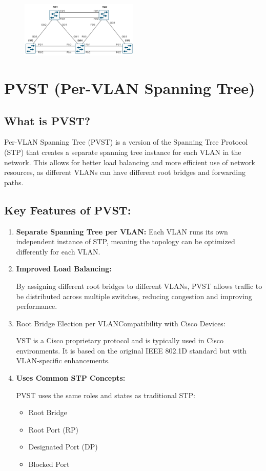 \documentclass[a4paper]{book}
\begin{document}
\begin{figure}[h]
    \centering
    \includegraphics[width=0.5\textwidth]{img/stp05.png}
    \caption{\textit{}}
\end{figure}

\chapter{PVST (Per-VLAN Spanning Tree)}

\section*{What is PVST?}
Per-VLAN Spanning Tree (PVST) is a version of the Spanning Tree Protocol (STP) that creates a separate spanning tree instance for each VLAN in the network. This allows for better load balancing and more efficient use of network resources, as different VLANs can have different root bridges and forwarding paths.


\section*{Key Features of PVST:}
\begin{enumerate}
    \item \textbf{Separate Spanning Tree per VLAN:}
    \newline
    Each VLAN runs its own independent instance of STP, meaning the topology can be optimized differently for each VLAN.
    \item \textbf{Improved Load Balancing:}
    
    By assigning different root bridges to different VLANs, PVST allows traffic to be distributed across multiple switches, reducing congestion and improving performance.
    
    \item Root Bridge Election per VLANCompatibility with Cisco Devices:
    
    VST is a Cisco proprietary protocol and is typically used in Cisco environments. It is based on the original IEEE 802.1D standard but with VLAN-specific enhancements.
    \item \textbf{Uses Common STP Concepts:}
    
    PVST uses the same roles and states as traditional STP:
    \begin{itemize}
        \item Root Bridge
        \item Root Port (RP)
        \item Designated Port (DP)
        \item Blocked Port
    \end{itemize}
\end{enumerate}
\end{document}
